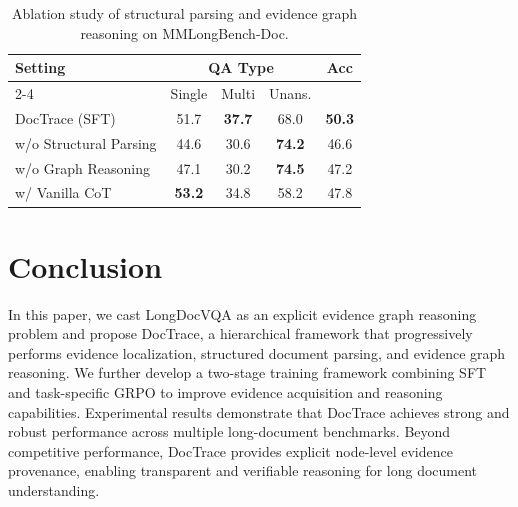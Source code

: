 \documentclass[letterpaper]{article} %
\begin{document}
\begin{table}[h]
\centering
\small

\begin{tabular}{lcccc}
\toprule
\multirow{2}{*}{\textbf{Setting}}
& \multicolumn{3}{c}{\textbf{QA Type}}
& \multirow{2}{*}{\textbf{Acc}} \\
\cmidrule(lr){2-4}
& Single & Multi & Unans. & \\
\midrule

DocTrace (SFT)
& 51.7
& \textbf{37.7}
& 68.0
& \textbf{50.3} \\

\midrule

w/o Structural Parsing
& 44.6
& 30.6
& \textbf{74.2}
& 46.6 \\

w/o Graph Reasoning
& 47.1
& 30.2
& \textbf{74.5}
& 47.2 \\

w/ Vanilla CoT
& \textbf{53.2}
& 34.8
& 58.2
& 47.8 \\

\bottomrule
\end{tabular}

\caption{
Ablation study of structural parsing and evidence graph reasoning on MMLongBench-Doc.
}
\label{tab:ablation_results}
\end{table}





\section{Conclusion}

In this paper, we cast LongDocVQA as an explicit evidence graph reasoning problem and propose DocTrace, a hierarchical framework that progressively performs evidence localization, structured document parsing, and evidence graph reasoning. We further develop a two-stage training framework combining SFT and task-specific GRPO to improve evidence acquisition and reasoning capabilities. Experimental results demonstrate that DocTrace achieves strong and robust performance across multiple long-document benchmarks. Beyond competitive performance, DocTrace provides explicit node-level evidence provenance, enabling transparent and verifiable reasoning for long document understanding.




\clearpage

\appendix
\end{document}
